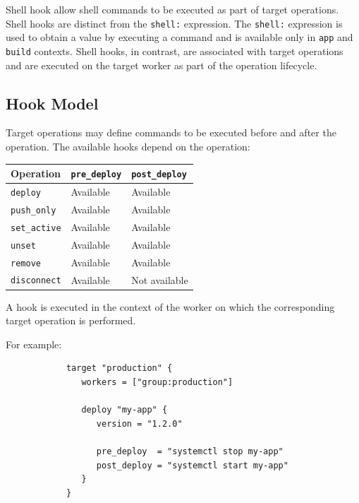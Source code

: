 \documentclass[11pt,a4paper]{article}
\begin{document}
    Shell hook allow shell commands to be executed as part of target operations.
    Shell hooks are distinct from the \texttt{shell:} expression.
    The \texttt{shell:} expression is used to obtain a value by executing a command and is available only in \texttt{app} and \texttt{build} contexts.
    Shell hooks, in contrast, are associated with target operations and are executed on the target worker as part of the operation lifecycle.

    \subsection{Hook Model}\label{subsec:hook-model}

    Target operations may define commands to be executed before and after the operation.
    The available hooks depend on the operation:

    \begin{center}
        \begin{tabular}{lll}
            \hline
            Operation            & \texttt{pre\_deploy} & \texttt{post\_deploy} \\
            \hline
            \texttt{deploy}      & Available            & Available             \\
            \texttt{push\_only}  & Available            & Available             \\
            \texttt{set\_active} & Available            & Available             \\
            \texttt{unset}       & Available            & Available             \\
            \texttt{remove}      & Available            & Available             \\
            \texttt{disconnect}  & Available            & Not available         \\
            \hline
        \end{tabular}
    \end{center}

    A hook is executed in the context of the worker on which the corresponding target operation is performed.

    For example:

    \begin{center}
        \begin{verbatim}
            target "production" {
               workers = ["group:production"]

               deploy "my-app" {
                  version = "1.2.0"

                  pre_deploy  = "systemctl stop my-app"
                  post_deploy = "systemctl start my-app"
               }
            }
        \end{verbatim}
    \end{center}
\end{document}
